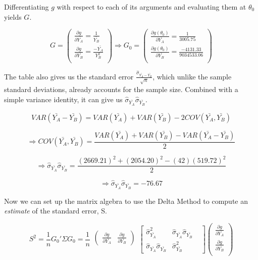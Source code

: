 \documentclass[11pt]{article}
\begin{document}
\bigskip Differentiating $g$ with respect to each of its arguments and evaluating them at $\theta_0$ yields $G$.

\[G =
\left(
\begin{array}{c}
\frac{\partial g}{\partial \bar{Y_A}} = \frac{1}{\bar{Y_B}}\\
\frac{\partial g}{\partial \bar{Y_B}} = \frac{-\bar{Y_A}}{Y_B^2}\\
\end{array}
\right)
\Rightarrow 
G_0 =
\left(
\begin{array}{c}
\frac{\partial g(\theta_0)}{\partial \bar{Y_A}}=\frac{1}{3005.75}\\
\frac{\partial g(\theta_0)}{\partial \bar{Y_B}}=\frac{-4131.33}{9034533.06}\\
\end{array}
\right)
\]

The table also gives us the standard error $\frac{\hat{\sigma}_{\bar{Y_A}-\bar{Y_B}}}{\sqrt{n}}$, which unlike the sample standard deviations, already accounts for the sample size. Combined with a simple variance identity, it can give us $\hat{\sigma}_{\bar{Y_A}}\hat{\sigma}_{\bar{Y_B}}$.

\[VAR(\bar{Y_A}-\bar{Y_B})=VAR(\bar{Y_A})+VAR(\bar{Y_B})-2COV(\bar{Y_A},\bar{Y_B})\]

\[\Rightarrow COV(\bar{Y_A},\bar{Y_B})=\frac{VAR(\bar{Y_A})+VAR(\bar{Y_B})-VAR(\bar{Y_A}-\bar{Y_B})}{2}\]

\[\Rightarrow \hat{\sigma}_{\bar{Y_A}}\hat{\sigma}_{\bar{Y_B}}=\frac{(2669.21)^2+(2054.20)^2-(42)(519.72)^2}{2}\]

\[\Rightarrow \hat{\sigma}_{\bar{Y_A}}\hat{\sigma}_{\bar{Y_B}}=-76.67\]

Now we can set up the matrix algebra to use the Delta Method to compute an \textit{estimate} of the standard error, S.

\[S^2 = \frac{1}{n}G_0' \Sigma G_0 = \frac{1}{n}\begin{matrix}\begin{pmatrix}\frac{\partial g}{\partial \bar{Y_A}} & \frac{\partial g}{\partial \bar{Y_B}}\end{pmatrix}\\\mbox{}\end{matrix}
\begin{bmatrix}
\hat{\sigma}_{\bar{Y_A}}^2 & \hat{\sigma}_{\bar{Y_A}}\hat{\sigma}_{\bar{Y_B}} & \\
\hat{\sigma}_{\bar{Y_A}}\hat{\sigma}_{\bar{Y_B}} & \hat{\sigma}_{\bar{Y_B}}^2 &
\end{bmatrix}
\left(\begin{array}{c}
\frac{\partial g}{\partial \bar{Y_A}}\\
\frac{\partial g}{\partial \bar{Y_B}}\\
\end{array}
\right)
\]
\end{document}
